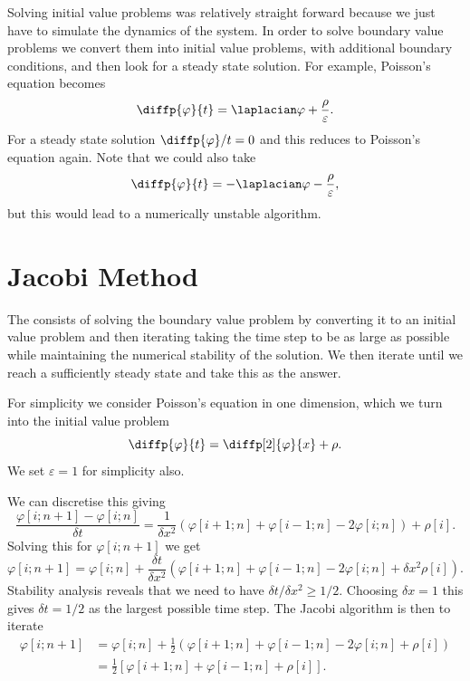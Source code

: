 \documentclass[fleqn]{NotesClass}
\begin{document}
    Solving initial value problems was relatively straight forward because we just have to simulate the dynamics of the system.
    In order to solve boundary value problems we convert them into initial value problems, with additional boundary conditions, and then look for a steady state solution.
    For example, Poisson's equation becomes
    \begin{equation}
        \diffp{\varphi}{t} = \laplacian\varphi + \frac{\rho}{\varepsilon}.
    \end{equation}
    For a steady state solution \(\diffp{\varphi}/{t} = 0\) and this reduces to Poisson's equation again.
    Note that we could also take
    \begin{equation}
        \diffp{\varphi}{t} = -\laplacian\varphi - \frac{\rho}{\varepsilon},
    \end{equation}
    but this would lead to a numerically unstable algorithm.
    
    \section{Jacobi Method}
    The  consists of solving the boundary value problem by converting it to an initial value problem and then iterating taking the time step to be as large as possible while maintaining the numerical stability of the solution.
    We then iterate until we reach a sufficiently steady state and take this as the answer.
    
    For simplicity we consider Poisson's equation in one dimension, which we turn into the initial value problem
    \begin{equation}
        \diffp{\varphi}{t} = \diffp[2]{\varphi}{x} + \rho.
    \end{equation}
    We set \(\varepsilon = 1\) for simplicity also.
    
    We can discretise this giving
    \begin{equation}
        \frac{\varphi[i; n + 1] - \varphi[i; n]}{\delta t} = \frac{1}{\delta x^2}(\varphi[i + 1; n] + \varphi[i - 1; n] - 2\varphi[i; n]) + \rho[i].
    \end{equation}
    Solving this for \(\varphi[i; n + 1]\) we get
    \begin{equation}
        \varphi[i; n + 1] = \varphi[i; n] + \frac{\delta t}{\delta x^2}(\varphi[i + 1; n] + \varphi[i - 1; n] - 2\varphi[i; n] + \delta x^2\rho[i]).
    \end{equation}
    Stability analysis reveals that we need to have \(\delta t/\delta x^2 \ge 1/2\).
    Choosing \(\delta x = 1\) this gives \(\delta t = 1/2\) as the largest possible time step.
    The Jacobi algorithm is then to iterate
    \begin{align}
        \varphi[i; n + 1] &= \varphi[i; n] + \frac{1}{2}(\varphi[i + 1; n] + \varphi[i - 1; n] - 2\varphi[i; n] + \rho[i])\\
        &= \frac{1}{2}[\varphi[i + 1; n] + \varphi[i - 1; n] + \rho[i]].
    \end{align}
    
\end{document}
